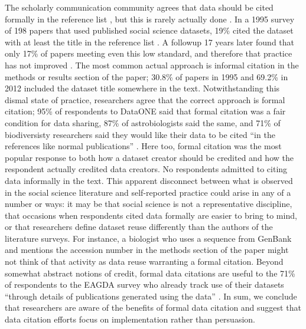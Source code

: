 \documentclass[10pt]{article}
\begin{document}
The scholarly communication community agrees that data should be cited formally in the reference list \cite{force11_data_citation_synthesis_group_joint_2014}, but this is rarely actually done \cite{sieber_not_1995, mooney_citing_2011, mooney_anatomy_2012}.
In a 1995 survey of 198 papers that used published social science datasets, 19\% cited the dataset with at least the title in the reference list \cite{sieber_not_1995}.
A followup 17 years later found that only 17\% of papers meeting even this low standard, and therefore that practice has not improved \cite{mooney_anatomy_2012}.
The most common actual approach is informal citation in the methods or results section of the paper; 30.8\% of papers in 1995 and 69.2\% in 2012 included the dataset title somewhere in the text.
Notwithstanding this dismal state of practice, researchers agree that the correct approach is formal citation; 95\% of respondents to DataONE said that formal citation was a fair condition for data sharing, 87\% of astrobiologists said the same, and 71\% of biodiversisty researchers said they would like their data to be cited ``in the references like normal publications'' \cite{tenopir_data_2011, aydinoglu_data_2014, enke_users_2012}.
Here too, formal citation was the most popular response to both how a dataset creator should be credited and how the respondent actually credited data creators.
No respondents admitted to citing data informally in the text.
This apparent disconnect between what is observed in the social science literature and self-reported practice could arise in any of a number or ways: it may be that social science is not a representative discipline, that occasions when respondents cited data formally are easier to bring to mind, or that researchers define dataset reuse differently than the authors of the literature surveys.
For instance, a biologist who uses a sequence from GenBank and mentions the accession number in the methods section of the paper might not think of that activity as data reuse warranting a formal citation.
Beyond somewhat abstract notions of credit, formal data citations are useful to the 71\% of respondents to the EAGDA survey who already track use of their datasets ``through details of publications generated using the data'' \cite{bobrow_establishing_2014}. 
In sum, we conclude that researchers are aware of the benefits of formal data citation and suggest that data citation efforts focus on implementation rather than persuasion. 
\end{document}
